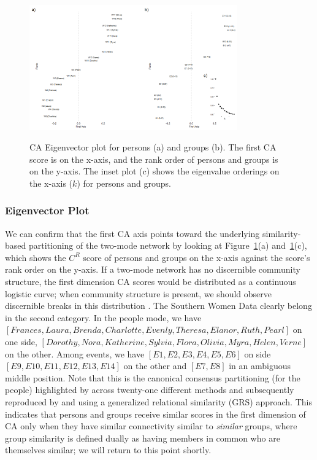 \documentclass[a4paper,fleqn]{cas-sc}
\begin{document}
\begin{figure}[ht!]
    \centering
        \includegraphics[width=0.8\textwidth]{Plots/ca-eigvec.png}            
        \label{fig:eigvec}
    \caption{CA Eigenvector plot for persons (a) and groups (b). The first CA score is on the x-axis, and the rank order of persons and groups is on the y-axis. The inset plot (c) shows the eigenvalue orderings on the x-axis ($k$) for persons and groups.}
    \label{fig:ca-eigvec}
\end{figure}

\subsubsection{Eigenvector Plot} \label{subsec:eigplot}
We can confirm that the first CA axis points toward the underlying similarity-based partitioning of the two-mode network by looking at Figure~\ref{fig:ca-eigvec}(a) and~\ref{fig:ca-eigvec}(c), which shows the $C^R$ score of persons and groups on the x-axis against the score's rank order on the y-axis. If a two-mode network has no discernible community structure, the first dimension CA scores would be distributed as a continuous logistic curve; when community structure is present, we should observe discernible breaks in this distribution \citep{van2021correspondence}. The Southern Women Data clearly belong in the second category. In the people mode, we have $\left[Frances, Laura, Brenda, Charlotte, Evenly, Theresa, Elanor, Ruth, Pearl\right]$ on one side, $\left[Dorothy, Nora, Katherine, Sylvia, Flora, Olivia, Myra, Helen, Verne\right]$ on the other. Among events, we have $\left[E1, E2, E3, E4, E5, E6\right]$ on side $\left[E9, E10, E11, E12, E13, E14\right]$ on the other and $\left[E7, E8\right]$ in an ambiguous middle position. Note that this is the canonical consensus partitioning (for the people) highlighted by \citet{freeman2003finding} across twenty-one different methods and subsequently reproduced by \citet{kovacs2010generalized} and \citet{lizardo2024two} using a generalized relational similarity (GRS) approach. This indicates that persons and groups receive similar scores in the first dimension of CA only when they have similar connectivity similar to \textit{similar} groups, where group similarity is defined dually as having members in common who are themselves similar; we will return to this point shortly. 
\end{document}
